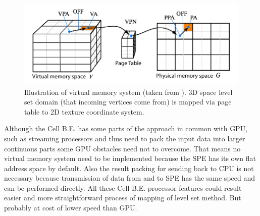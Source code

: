 \begin{figure}
    \centering
    \includegraphics[width=\textwidth]{data/png/gpuVirtMemory}
    \caption[GPU virtual memory]{Illustration of virtual memory system (taken from \cite{lefonhGPUSolver}). 3D space level set domain (that incoming vertices come from) is mapped via page table to 2D texture coordinate system.}
    \label{fg:virtual memory on GPU}
\end{figure}

\par
Although the Cell B.E. has some parts of the approach in common with GPU, such as streaming processors and thus need to pack the input data into larger continuous parts some GPU obstacles need not to overcome.
That means no virtual memory system need to be implemented because the SPE has its own flat address space by default.
Also the result packing for sending back to CPU is not necessary because transmission of data from and to SPE has the same speed and can be performed directly.
All these Cell B.E. processor features could result easier and more straightforward process of mapping of level set method.
But probably at cost of lower speed than GPU.